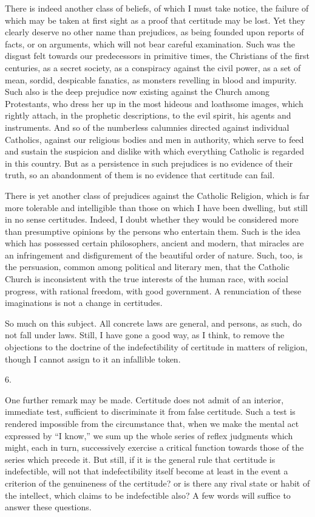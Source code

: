 There is indeed another class of beliefs, of which I must take
notice, the failure of which may be taken at first sight as a proof
that certitude may be lost. Yet they clearly deserve no other name
than prejudices, as being founded upon reports of facts, or on
arguments, which will not bear careful examination. Such was the
disgust felt towards our predecessors in primitive times, the
Christians of the first centuries, as a secret society, as a
conspiracy against the civil power, as a set of mean, sordid,
despicable fanatics, as monsters revelling in blood and impurity. Such
also is the deep prejudice now existing against the Church among
Protestants, who dress her up in the most hideous and loathsome
images, which rightly attach, in the prophetic descriptions, to the
evil spirit, his agents and instruments. And so of the numberless
calumnies directed against individual Catholics, against our religious
bodies and men in authority, which serve to feed and sustain the
suspicion and dislike with which everything Catholic is regarded in
this country. But as a persistence in such prejudices is no evidence
of their truth, so an abandonment of them is no evidence that
certitude can fail.

There is yet another class of prejudices against the Catholic
Religion, which is far more tolerable and intelligible than those on
which I have been dwelling, but still in no sense certitudes. Indeed,
I doubt whether they would be considered more than presumptive
opinions by the persons who entertain them. Such is the idea
which has possessed certain philosophers, ancient and modern, that
miracles are an infringement and disfigurement of the beautiful order
of nature. Such, too, is the persuasion, common among political and
literary men, that the Catholic Church is inconsistent with the true
interests of the human race, with social progress, with rational
freedom, with good government. A renunciation of these imaginations is
not a change in certitudes.

So much on this subject. All concrete laws are general, and
persons, as such, do not fall under laws. Still, I have gone a good
way, as I think, to remove the objections to the doctrine of the
indefectibility of certitude in matters of religion, though I cannot
assign to it an infallible token.

6.

One further remark may be made. Certitude does not admit of an
interior, immediate test, sufficient to discriminate it from false
certitude. Such a test is rendered impossible from the circumstance
that, when we make the mental act expressed by ``I know,'' we
sum up the whole series of reflex judgments which might, each in turn,
successively exercise a critical function towards those of the series
which precede it. But still, if it is the general rule that certitude
is indefectible, will not that indefectibility itself become at least
in the event a criterion of the genuineness of the certitude? or is
there any rival state or habit of the intellect, which claims to be
indefectible also? A few words will suffice to answer these questions.


